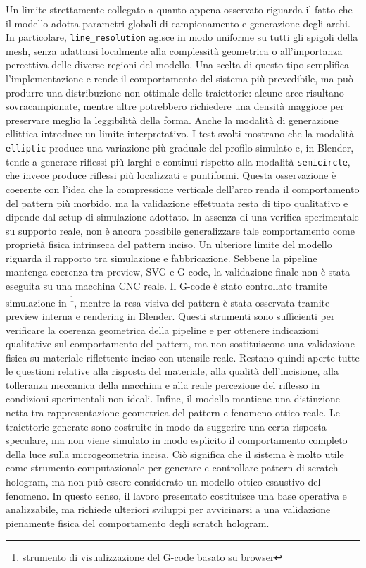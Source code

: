 \documentclass[a4paper,11pt,titlepage,twoside]{book}
\newcommand{\1}{\mathbf{1}}
\numberwithin{equation}{chapter}
\theoremstyle{plain}
\theoremstyle{definition}
\begin{document}
	Un limite strettamente collegato a quanto appena osservato riguarda il fatto che il modello adotta parametri globali di campionamento e generazione degli archi. In particolare, \texttt{line\_resolution} agisce in modo uniforme su tutti gli spigoli della mesh, senza adattarsi localmente alla complessità geometrica o all’importanza percettiva delle diverse regioni del modello. Una scelta di questo tipo semplifica l’implementazione e rende il comportamento del sistema più prevedibile, ma può produrre una distribuzione non ottimale delle traiettorie: alcune aree risultano sovracampionate, mentre altre potrebbero richiedere una densità maggiore per preservare meglio la leggibilità della forma.
	Anche la modalità di generazione ellittica introduce un limite interpretativo. I test svolti mostrano che la modalità \texttt{elliptic} produce una variazione più graduale del profilo simulato e, in Blender, tende a generare riflessi più larghi e continui rispetto alla modalità \texttt{semicircle}, che invece produce riflessi più localizzati e puntiformi. Questa osservazione è coerente con l’idea che la compressione verticale dell’arco renda il comportamento del pattern più morbido, ma la validazione effettuata resta di tipo qualitativo e dipende dal setup di simulazione adottato. In assenza di una verifica sperimentale su supporto reale, non è ancora possibile generalizzare tale comportamento come proprietà fisica intrinseca del pattern inciso.
	Un ulteriore limite del modello riguarda il rapporto tra simulazione e fabbricazione. Sebbene la pipeline mantenga coerenza tra preview, SVG e G-code, la validazione finale non è stata eseguita su una macchina CNC reale. Il G-code è stato controllato tramite simulazione in \footnote{strumento di visualizzazione del G-code basato su browser}, mentre la resa visiva del pattern è stata osservata tramite preview interna e rendering in Blender. Questi strumenti sono sufficienti per verificare la coerenza geometrica della pipeline e per ottenere indicazioni qualitative sul comportamento del pattern, ma non sostituiscono una validazione fisica su materiale riflettente inciso con utensile reale. Restano quindi aperte tutte le questioni relative alla risposta del materiale, alla qualità dell’incisione, alla tolleranza meccanica della macchina e alla reale percezione del riflesso in condizioni sperimentali non ideali.
	Infine, il modello mantiene una distinzione netta tra rappresentazione geometrica del pattern e fenomeno ottico reale. Le traiettorie generate sono costruite in modo da suggerire una certa risposta speculare, ma non viene simulato in modo esplicito il comportamento completo della luce sulla microgeometria incisa. Ciò significa che il sistema è molto utile come strumento computazionale per generare e controllare pattern di scratch hologram, ma non può essere considerato un modello ottico esaustivo del fenomeno. In questo senso, il lavoro presentato costituisce una base operativa e analizzabile, ma richiede ulteriori sviluppi per avvicinarsi a una validazione pienamente fisica del comportamento degli scratch hologram.
	
\end{document}
